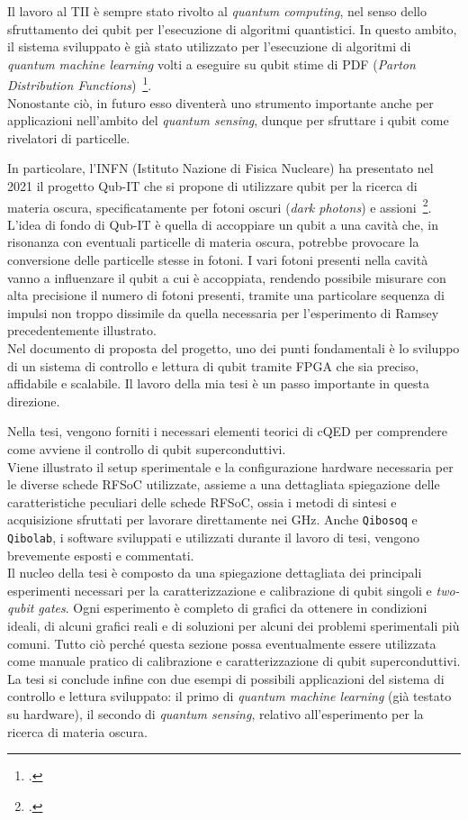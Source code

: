 \documentclass{article}
\newcommand{\Qibolab}{\texttt{Qibolab}\xspace}
\newcommand{\Qibosoq}{\texttt{Qibosoq}\xspace}
\begin{document}
Il lavoro al TII è sempre stato rivolto al \textit{quantum computing}, nel senso dello sfruttamento dei qubit per l'esecuzione di algoritmi quantistici.
In questo ambito, il sistema sviluppato è già stato utilizzato per l'esecuzione di algoritmi di \textit{quantum machine learning} volti a eseguire su qubit stime di PDF (\textit{Parton Distribution Functions})~\footcite{Robbiati2023}.\\
%
Nonostante ciò, in futuro esso diventerà uno strumento importante anche per applicazioni nell'ambito del \textit{quantum sensing}, dunque per sfruttare i qubit come rivelatori di particelle.

In particolare, l'INFN (Istituto Nazione di Fisica Nucleare) ha presentato nel 2021 il progetto Qub-IT che si propone di utilizzare qubit per la ricerca di materia oscura, specificatamente per fotoni oscuri (\textit{dark photons}) e assioni~\footcite{qubit_project}.
L'idea di fondo di Qub-IT è quella di accoppiare un qubit a una cavità che, in risonanza con eventuali particelle di materia oscura, potrebbe provocare la conversione delle particelle stesse in fotoni. 
I vari fotoni presenti nella cavità vanno a influenzare il qubit a cui è accoppiata, rendendo possibile misurare con alta precisione il numero di fotoni presenti, tramite una particolare sequenza di impulsi non troppo dissimile da quella necessaria per l'esperimento di Ramsey precedentemente illustrato.\\
%
Nel documento di proposta del progetto, uno dei punti fondamentali è lo sviluppo di un sistema di controllo e lettura di qubit tramite FPGA che sia preciso, affidabile e scalabile.
Il lavoro della mia tesi è un passo importante in questa direzione.


Nella tesi, vengono forniti i necessari elementi teorici di cQED per comprendere come avviene il controllo di qubit superconduttivi.\\
Viene illustrato il setup sperimentale e la configurazione hardware necessaria per le diverse schede RFSoC utilizzate, assieme a una dettagliata spiegazione delle caratteristiche peculiari delle schede RFSoC, ossia i metodi di sintesi e acquisizione sfruttati per lavorare direttamente nei GHz.
Anche \Qibosoq e \Qibolab, i software sviluppati e utilizzati durante il lavoro di tesi, vengono brevemente esposti e commentati.\\
Il nucleo della tesi è composto da una spiegazione dettagliata dei principali esperimenti necessari per la caratterizzazione e calibrazione di qubit singoli e \textit{two-qubit gates}.
Ogni esperimento è completo di grafici da ottenere in condizioni ideali, di alcuni grafici reali e di soluzioni per alcuni dei problemi sperimentali più comuni. 
Tutto ciò perché questa sezione possa eventualmente essere utilizzata come manuale pratico di calibrazione e caratterizzazione di qubit superconduttivi.\\
%
La tesi si conclude infine con due esempi di possibili applicazioni del sistema di controllo e lettura sviluppato: il primo di \textit{quantum machine learning} (già testato su hardware), il secondo di \textit{quantum sensing}, relativo all'esperimento per la ricerca di materia oscura.
\end{document}
